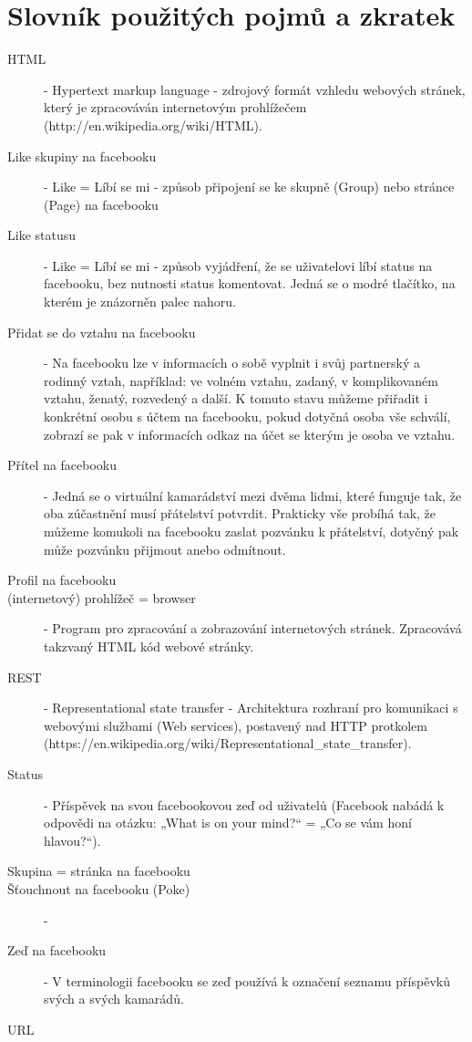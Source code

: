 \documentclass[thesis=M,czech]{FITthesis}[2013/05/10]
\begin{document}
\chapter{Slovník použitých pojmů a zkratek}
\begin{description}
	\item[HTML] - Hypertext markup language - zdrojový formát vzhledu webových stránek, který je zpracováván internetovým prohlížečem
		\newline(http://en.wikipedia.org/wiki/HTML).
	\item[Like skupiny na facebooku] - Like = Líbí se mi - způsob připojení se ke skupně (Group) nebo stránce (Page) na facebooku
	\item[Like statusu] - Like = Líbí se mi - způsob vyjádření, že se uživatelovi líbí status na facebooku, bez nutnosti status komentovat. Jedná se o modré tlačítko, na kterém je znázorněn palec nahoru.
	\item[Přidat se do vztahu na facebooku] - Na facebooku lze v informacích o sobě vyplnit i svůj partnerský a rodinný vztah, například: ve volném vztahu, zadaný, v komplikovaném vztahu, ženatý, rozvedený a další. K tomuto stavu můžeme přiřadit i konkrétní osobu s účtem na facebooku, pokud dotyčná osoba vše schválí, zobrazí se pak v informacích odkaz na účet se kterým je osoba ve vztahu.
	\item[Přítel na facebooku] - Jedná se o virtuální kamarádství mezi dvěma lidmi, které funguje tak, že oba zúčastnění musí přátelství potvrdit. Prakticky vše probíhá tak, že můžeme komukoli na facebooku zaslat pozvánku k přátelství, dotyčný pak může pozvánku přijmout anebo odmítnout.  
	\item[Profil na facebooku]
	\item[(internetový) prohlížeč = browser] - Program pro zpracování a zobrazování internetových stránek. Zpracovává takzvaný HTML kód webové stránky.
	\item[REST] - Representational state transfer - Architektura rozhraní pro komunikaci s webovými službami (Web services), postavený nad HTTP protkolem
\newline(https://en.wikipedia.org/wiki/Representational\_state\_transfer).
	\item[Status] - Příspěvek na svou facebookovou zeď od uživatelů (Facebook nabádá k odpovědi na otázku: „What is on your mind?“ = „Co se vám honí hlavou?“).
	\item[Skupina = stránka na facebooku]
	\item[Šťouchnout na facebooku (Poke)] -
	\item[Zeď na facebooku] - V terminologii facebooku se zeď používá k označení seznamu příspěvků svých a svých kamarádů.
	\item[URL]
\end{description}
\end{document}
